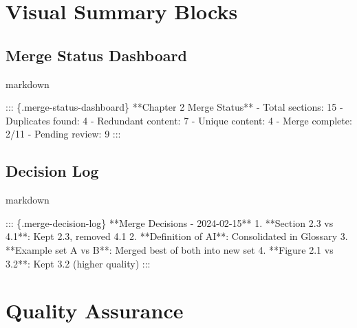 \documentclass[
  11pt,
  letterpaper,
]{book}
\newenvironment{Shaded}{\begin{snugshade}}{\end{snugshade}}
\newcommand{\NormalTok}[1]{\textcolor[rgb]{0.00,0.23,0.31}{#1}}
\newcommand{\SpecialStringTok}[1]{\textcolor[rgb]{0.13,0.47,0.30}{#1}}
\begin{document}
\section*{Visual Summary Blocks}\label{visual-summary-blocks}


\subsection*{Merge Status Dashboard}\label{merge-status-dashboard}

markdown

\begin{Shaded}
\begin{Highlighting}[]
\NormalTok{::: \{.merge{-}status{-}dashboard\}}
\NormalTok{**Chapter 2 Merge Status**}
\SpecialStringTok{{-} }\NormalTok{Total sections: 15}
\SpecialStringTok{{-} }\NormalTok{Duplicates found: 4}
\SpecialStringTok{{-} }\NormalTok{Redundant content: 7}
\SpecialStringTok{{-} }\NormalTok{Unique content: 4}
\SpecialStringTok{{-} }\NormalTok{Merge complete: 2/11}
\SpecialStringTok{{-} }\NormalTok{Pending review: 9}
\NormalTok{:::}
\end{Highlighting}
\end{Shaded}

\subsection*{Decision Log}\label{decision-log}

markdown

\begin{Shaded}
\begin{Highlighting}[]
\NormalTok{::: \{.merge{-}decision{-}log\}}
\NormalTok{**Merge Decisions {-} 2024{-}02{-}15**}
\SpecialStringTok{1. }\NormalTok{**Section 2.3 vs 4.1**: Kept 2.3, removed 4.1}
\SpecialStringTok{2. }\NormalTok{**Definition of AI**: Consolidated in Glossary}
\SpecialStringTok{3. }\NormalTok{**Example set A vs B**: Merged best of both into new set}
\SpecialStringTok{4. }\NormalTok{**Figure 2.1 vs 3.2**: Kept 3.2 (higher quality)}
\NormalTok{:::}
\end{Highlighting}
\end{Shaded}

\section*{Quality Assurance}\label{quality-assurance}
\end{document}
